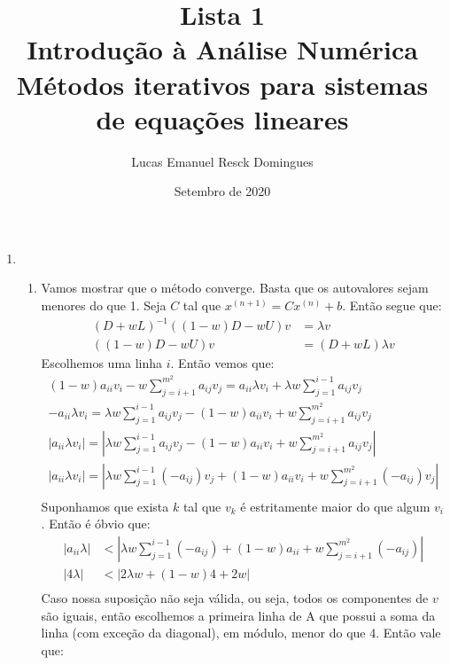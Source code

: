 \documentclass{article}
\title{Lista 1 \\
\large Introdução à Análise Numérica \\
Métodos iterativos para sistemas de equações lineares}
\author{Lucas Emanuel Resck Domingues}
\date{Setembro de 2020}
\begin{document}
    \maketitle

    \begin{enumerate}
        \item \begin{enumerate}
            \item Vamos mostrar que o método converge.
                Basta que os autovalores sejam menores do que 1.
                Seja $C$ tal que $x^{(n+1)} = Cx^{(n)} + b$. Então segue que:
                \begin{align*}
                    (D+wL)^{-1}((1-w)D-wU)v &= \lambda v \\
                    ((1-w)D-wU)v &= (D+wL)\lambda v
                \end{align*}
                Escolhemos uma linha $i$. Então vemos que:
                \begin{align*}
                    (1-w)a_{ii}v_i - w \sum_{j=i+1}^{m^2} a_{ij}v_j = a_{ii} \lambda v_i + \lambda w \sum_{j=1}^{i-1} a_{ij}v_j \\
                    -a_{ii} \lambda v_i = \lambda w \sum_{j=1}^{i-1} a_{ij}v_j - (1-w)a_{ii}v_i + w \sum_{j=i+1}^{m^2} a_{ij}v_j \\
                    |a_{ii} \lambda v_i| = \left|\lambda w \sum_{j=1}^{i-1} a_{ij}v_j - (1-w)a_{ii}v_i + w \sum_{j=i+1}^{m^2} a_{ij}v_j\right| \\
                    |a_{ii} \lambda v_i| = \left|\lambda w \sum_{j=1}^{i-1} (-a_{ij})v_j + (1-w)a_{ii}v_i + w \sum_{j=i+1}^{m^2} (-a_{ij})v_j\right| \\
                \end{align*}
                Suponhamos que exista $k$ tal que $v_k$ é estritamente maior do que algum $v_i$. Então é óbvio que:
                \begin{align*}
                    |a_{ii} \lambda| &< \left|\lambda w \sum_{j=1}^{i-1} (-a_{ij}) + (1-w)a_{ii} + w \sum_{j=i+1}^{m^2} (-a_{ij})\right| \\
                    |4 \lambda| &< \left|2\lambda w + (1-w)4 + 2w\right| \\
                \end{align*}
                Caso nossa suposição não seja válida, ou seja, todos os componentes de $v$ são iguais, então escolhemos a primeira linha de A
                que possui a soma da linha (com exceção da diagonal), em módulo, menor do que 4. Então vale que:

\end{enumerate}
\end{enumerate}
\end{document}

